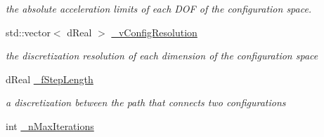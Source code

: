 \begin{DoxyCompactItemize}
\begin{DoxyCompactList}\small\item\em the absolute acceleration limits of each DOF of the configuration space. \item\end{DoxyCompactList}\item 
\hypertarget{classOpenRAVE_1_1PlannerBase_1_1PlannerParameters_a803fc76d967c3adcf76e737344977d62}{
std::vector$<$ dReal $>$ \hyperlink{classOpenRAVE_1_1PlannerBase_1_1PlannerParameters_a803fc76d967c3adcf76e737344977d62}{\_\-vConfigResolution}}
\label{classOpenRAVE_1_1PlannerBase_1_1PlannerParameters_a803fc76d967c3adcf76e737344977d62}

\begin{DoxyCompactList}\small\item\em the discretization resolution of each dimension of the configuration space \item\end{DoxyCompactList}\item 
dReal \hyperlink{classOpenRAVE_1_1PlannerBase_1_1PlannerParameters_a377dd1c13871195e977151411e0033bf}{\_\-fStepLength}
\begin{DoxyCompactList}\small\item\em a discretization between the path that connects two configurations \item\end{DoxyCompactList}\item 
\hypertarget{classOpenRAVE_1_1PlannerBase_1_1PlannerParameters_a75940963abf9391dca1ec1d48b7a11cc}{
int \hyperlink{classOpenRAVE_1_1PlannerBase_1_1PlannerParameters_a75940963abf9391dca1ec1d48b7a11cc}{\_\-nMaxIterations}}
\label{classOpenRAVE_1_1PlannerBase_1_1PlannerParameters_a75940963abf9391dca1ec1d48b7a11cc}


\end{DoxyCompactItemize}
